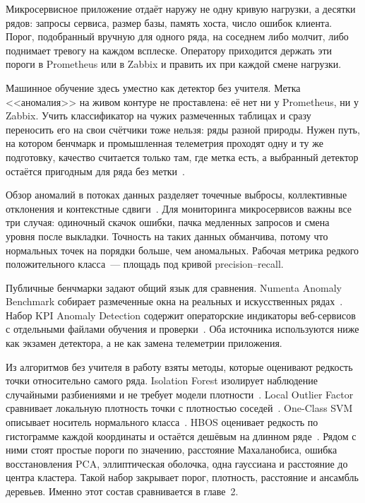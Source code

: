 \introduction

\actuality

Микросервисное приложение отдаёт наружу не одну кривую нагрузки, а десятки рядов: запросы сервиса, размер базы, память хоста, число ошибок клиента.
Порог, подобранный вручную для одного ряда, на соседнем либо молчит, либо поднимает тревогу на каждом всплеске.
Оператору приходится держать эти пороги в Prometheus или в Zabbix и править их при каждой смене нагрузки.

Машинное обучение здесь уместно как детектор без учителя.
Метка <<аномалия>> на живом контуре не проставлена: её нет ни у Prometheus, ни у Zabbix.
Учить классификатор на чужих размеченных таблицах и сразу переносить его на свои счётчики тоже нельзя: ряды разной природы.
Нужен путь, на котором бенчмарк и промышленная телеметрия проходят одну и ту же подготовку, качество считается только там, где метка есть, а выбранный детектор остаётся пригодным для ряда без метки~\cite{chandola2009anomaly}.

\review

Обзор аномалий в потоках данных разделяет точечные выбросы, коллективные отклонения и контекстные сдвиги~\cite{chandola2009anomaly}.
Для мониторинга микросервисов важны все три случая: одиночный скачок ошибки, пачка медленных запросов и смена уровня после выкладки.
Точность на таких данных обманчива, потому что нормальных точек на порядки больше, чем аномальных.
Рабочая метрика редкого положительного класса~--- площадь под кривой precision--recall.

Публичные бенчмарки задают общий язык для сравнения.
Numenta Anomaly Benchmark собирает размеченные окна на реальных и искусственных рядах~\cite{numenta-nab}.
Набор KPI Anomaly Detection содержит операторские индикаторы веб-сервисов с отдельными файлами обучения и проверки~\cite{kpi-ad}.
Оба источника используются ниже как экзамен детектора, а не как замена телеметрии приложения.

Из алгоритмов без учителя в работу взяты методы, которые оценивают редкость точки относительно самого ряда.
Isolation Forest изолирует наблюдение случайными разбиениями и не требует модели плотности~\cite{liu2008isolation}.
Local Outlier Factor сравнивает локальную плотность точки с плотностью соседей~\cite{breunig2000lof}.
One-Class SVM описывает носитель нормального класса~\cite{scholkopf2001ocsvm}.
HBOS оценивает редкость по гистограмме каждой координаты и остаётся дешёвым на длинном ряде~\cite{goldstein2012hbos}.
Рядом с ними стоят простые пороги по значению, расстояние Махаланобиса, ошибка восстановления PCA, эллиптическая оболочка, одна гауссиана и расстояние до центра кластера.
Такой набор закрывает порог, плотность, расстояние и ансамбль деревьев.
Именно этот состав сравнивается в главе~2.

